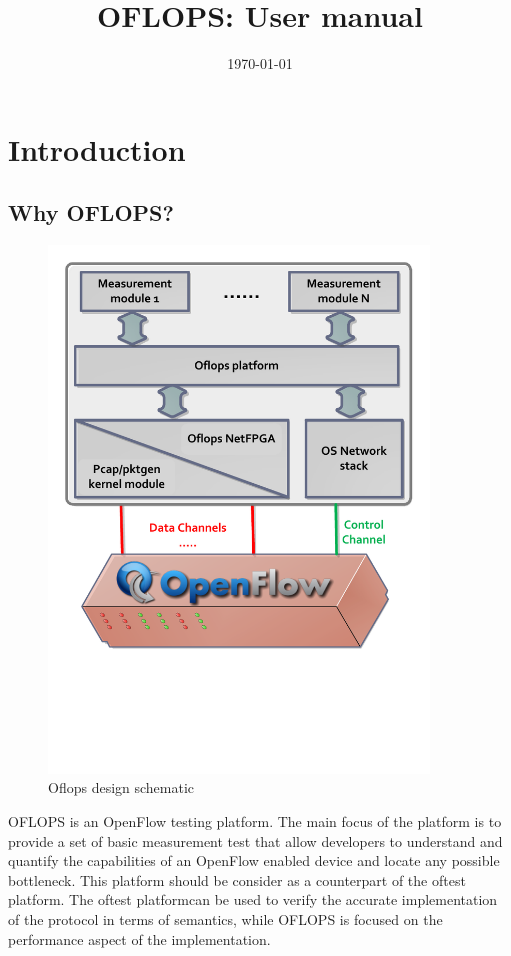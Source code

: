 \documentclass{book}
\title{OFLOPS: User manual}
\date{\today}
\begin{document}
\maketitle

\chapter{Introduction}

\section{Why OFLOPS?}

\begin{figure}[htb]
\begin{center}
\includegraphics[width=0.9\textwidth]{openflow-design}
\end{center}
\caption{Oflops design schematic}
\label{oflops-design}
\end{figure}

OFLOPS is an OpenFlow testing platform. The main focus of the platform is 
to provide a set of basic measurement test that allow developers to understand and
quantify the capabilities of an OpenFlow enabled device and locate any
possible bottleneck. This platform should be consider as a counterpart of the
oftest platform. The oftest platformcan be used to verify the accurate
implementation of the protocol in terms of semantics, while OFLOPS is focused on the
performance aspect of the implementation. 
\end{document}

